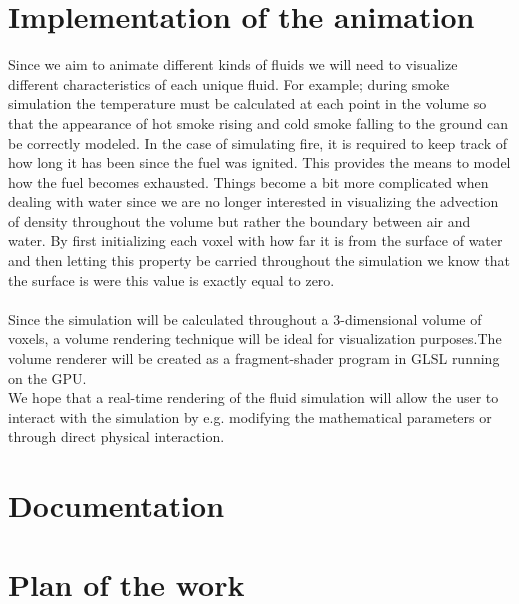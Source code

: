 \documentclass[a4paper,12pt,twoside,swedish]{report}
\begin{document}
\section{Implementation of the animation}
Since we aim to animate different kinds of fluids we will need to visualize different characteristics of each unique fluid.
For example; during smoke simulation the temperature must be calculated at each point in the volume so that the appearance of hot smoke rising and cold smoke falling to the ground can be correctly modeled. In the case of simulating fire, it is required to keep track of how long it has been since the fuel was ignited. This provides the means to model how the fuel becomes exhausted.
Things become a bit more complicated when dealing with water since we are no longer interested in visualizing the advection of density throughout the volume but rather the boundary between air and water. By first initializing each voxel with how far it is from the surface of water and then letting this property be carried throughout the simulation we know that the surface is were this value is exactly equal to zero.\\\\
Since the simulation will be calculated throughout a 3-dimensional volume of voxels, a volume rendering technique will be ideal for visualization purposes.The volume renderer will be created as a fragment-shader program   in GLSL running on the GPU.\\
We hope that a real-time rendering of the fluid simulation will allow the user to interact with the simulation by e.g. modifying the mathematical parameters or through direct physical interaction.\\


\section{Documentation}


\section{Plan of the work}
	
\end{document}
